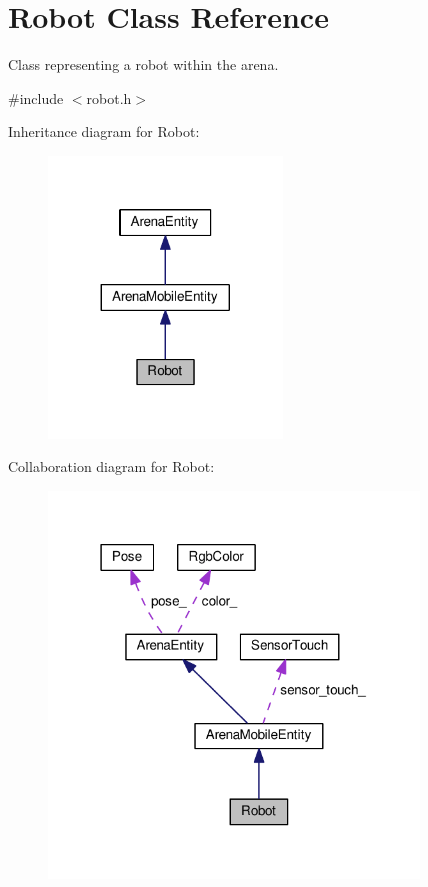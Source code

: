 \hypertarget{classRobot}{}\section{Robot Class Reference}
\label{classRobot}


Class representing a robot within the arena.  




{\ttfamily \#include $<$robot.\+h$>$}



Inheritance diagram for Robot\+:\nopagebreak
\begin{figure}[H]
\begin{center}
\leavevmode
\includegraphics[width=176pt]{classRobot__inherit__graph}
\end{center}
\end{figure}


Collaboration diagram for Robot\+:\nopagebreak
\begin{figure}[H]
\begin{center}
\leavevmode
\includegraphics[width=279pt]{classRobot__coll__graph}
\end{center}
\end{figure}
